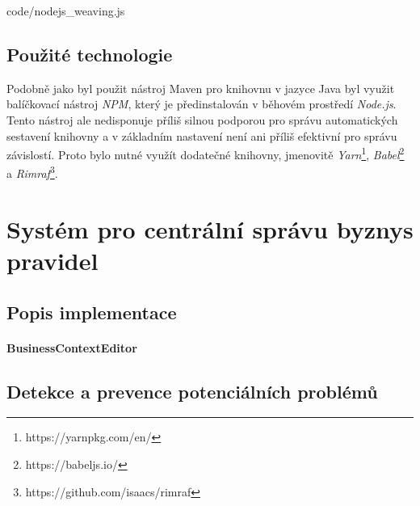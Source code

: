 
{code/nodejs_weaving.js}

\subsection{Použité technologie}

Podobně jako byl použit nástroj Maven pro knihovnu v jazyce Java byl
využit balíčkovací nástroj \textit{NPM}, který je předinstalován
v běhovém prostředí \textit{Node.js}. Tento nástroj ale nedisponuje
příliš silnou podporou pro správu automatických sestavení knihovny
a v základním nastavení není ani příliš efektivní pro správu závislostí.
Proto bylo nutné využít dodatečné knihovny, jmenovitě
\textit{Yarn}\footnote{https://yarnpkg.com/en/},
\textit{Babel}\footnote{https://babeljs.io/} a
\textit{Rimraf}\footnote{https://github.com/isaacs/rimraf}.

\section{Systém pro centrální správu byznys pravidel}




\subsection{Popis implementace}

\paragraph{BusinessContextEditor} %

\subsection{Detekce a prevence potenciálních problémů}

